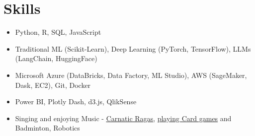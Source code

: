 \documentclass[letterpaper,11pt]{article}
\newcommand{\resumeItem}[1]{
\justifying
  \item{\small{#1}}
  \vspace{-2px}
}
\newcommand{\resumeItemListStart}{\vspace{-3pt}\begin{itemize}}
\newcommand{\resumeItemListEnd}{\end{itemize}}
\begin{document}
\section{\Large{Skills}}
\vspace{3pt}
\begin{itemize}[leftmargin=0.00in, label={}, itemsep=0pt, parsep=0pt]
    \item{
        {\fontsize{10.2pt}{13pt}\selectfont{Programming Languages:}}
        \small{Python, R, SQL, JavaScript} 
        }



    \item{
        {\fontsize{10pt}{13pt}\selectfont{AI and ML:}}
        \small{Traditional ML (Scikit-Learn), Deep Learning (PyTorch, TensorFlow), LLMs (LangChain, HuggingFace)}
        }

    \item{
        {\fontsize{10pt}{13pt}\selectfont{Cloud Data Tools:}}
        \small{Microsoft Azure (DataBricks, Data Factory, ML Studio), AWS (SageMaker, Dask, EC2), Git, Docker}
        }

    \item{
        {\fontsize{10pt}{13pt}\selectfont{Data Visualization:}}
        \small{Power BI, Plotly Dash, d3.js, QlikSense}
        }
    \item{
    {\fontsize{10pt}{13pt}\selectfont{Interests and Hobbies:}}
    \small{Singing and enjoying Music - \href{https://vishuragams.pages.dev}{\underline{Carnatic Ragas}}, \href{https://vishugp.github.io/Thuruppu/}{{playing Card games}} and Badminton, Robotics}
    }
\end{itemize}


\end{document}
